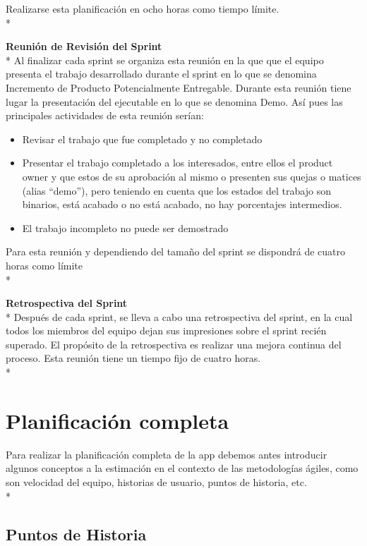 \documentclass[../pfc.tex]{subfiles}
\begin{document}
	Realizarse esta planificación en ocho horas como tiempo límite.\\*
	
	\textbf{Reunión de Revisión del Sprint}\\*
	Al finalizar cada sprint se organiza esta reunión en la que que el equipo presenta el trabajo desarrollado durante el sprint en lo que se denomina Incremento de Producto Potencialmente Entregable. Durante esta reunión tiene lugar la presentación del ejecutable en lo que se denomina Demo. Así pues las principales actividades de esta reunión serían:
	\begin{itemize} 
		\item Revisar el trabajo que fue completado y no completado 
		\item 	Presentar el trabajo completado a los interesados, entre ellos el product owner y que estos de su aprobación al mismo o presenten sus quejas o matices (alias “demo”), pero teniendo en cuenta que los estados del trabajo son binarios, está acabado o no está acabado, no hay porcentajes intermedios. 
		\item El trabajo incompleto no puede ser demostrado 
	\end{itemize}
	
	Para esta reunión y dependiendo del tamaño del sprint se dispondrá de cuatro horas como límite\\*
	
	\textbf{Retrospectiva del Sprint }\\*
	Después de cada sprint, se lleva a cabo una retrospectiva del sprint, en la cual todos los miembros del equipo dejan sus impresiones sobre el sprint recién superado. El propósito de la retrospectiva es realizar una mejora continua del proceso. Esta reunión tiene un tiempo fijo de cuatro horas.\\*
	
	\section{Planificación completa}
	
	Para realizar la planificación completa de la app debemos antes introducir algunos conceptos a la estimación en el contexto de las metodologías ágiles, como son velocidad del equipo, historias de usuario, puntos de historia, etc.\\*   
	
	\subsection{Puntos de Historia}
	
\end{document}
